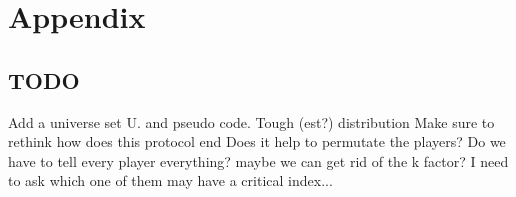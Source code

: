 \documentclass{article}
\theoremstyle{plain}
\begin{document}
\section{Appendix}


\subsection{TODO}
Add a universe set U. and pseudo code. 
Tough (est?) distribution\newline
Make sure to rethink how does this protocol end \newline
Does it help to permutate the players? \newline
Do we have to tell every player everything? maybe we can get rid of the k factor? I need to ask which one of them may have a critical index... \newline
\end{document}
